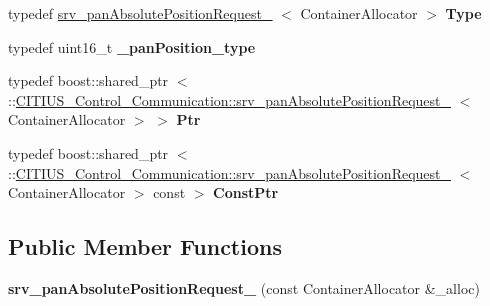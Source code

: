 \begin{DoxyCompactItemize}
\item 
\hypertarget{struct_c_i_t_i_u_s___control___communication_1_1srv__pan_absolute_position_request___a421feafac29586fac2a1c6402ce5b292}{typedef \*
\hyperlink{struct_c_i_t_i_u_s___control___communication_1_1srv__pan_absolute_position_request__}{srv\-\_\-pan\-Absolute\-Position\-Request\-\_\-}\*
$<$ \-Container\-Allocator $>$ {\bfseries \-Type}}\label{struct_c_i_t_i_u_s___control___communication_1_1srv__pan_absolute_position_request___a421feafac29586fac2a1c6402ce5b292}

\item 
\hypertarget{struct_c_i_t_i_u_s___control___communication_1_1srv__pan_absolute_position_request___a801be9388c10191e3f118bec0f98c4f3}{typedef uint16\-\_\-t {\bfseries \-\_\-pan\-Position\-\_\-type}}\label{struct_c_i_t_i_u_s___control___communication_1_1srv__pan_absolute_position_request___a801be9388c10191e3f118bec0f98c4f3}

\item 
\hypertarget{struct_c_i_t_i_u_s___control___communication_1_1srv__pan_absolute_position_request___a12a7f31d5251daf0cb25d2c91fa1fe79}{typedef boost\-::shared\-\_\-ptr\*
$<$ \-::\hyperlink{struct_c_i_t_i_u_s___control___communication_1_1srv__pan_absolute_position_request__}{\-C\-I\-T\-I\-U\-S\-\_\-\-Control\-\_\-\-Communication\-::srv\-\_\-pan\-Absolute\-Position\-Request\-\_\-}\*
$<$ \-Container\-Allocator $>$ $>$ {\bfseries \-Ptr}}\label{struct_c_i_t_i_u_s___control___communication_1_1srv__pan_absolute_position_request___a12a7f31d5251daf0cb25d2c91fa1fe79}

\item 
\hypertarget{struct_c_i_t_i_u_s___control___communication_1_1srv__pan_absolute_position_request___a758810da9625594a846e380fac9e8e9e}{typedef boost\-::shared\-\_\-ptr\*
$<$ \-::\hyperlink{struct_c_i_t_i_u_s___control___communication_1_1srv__pan_absolute_position_request__}{\-C\-I\-T\-I\-U\-S\-\_\-\-Control\-\_\-\-Communication\-::srv\-\_\-pan\-Absolute\-Position\-Request\-\_\-}\*
$<$ \-Container\-Allocator $>$ const  $>$ {\bfseries \-Const\-Ptr}}\label{struct_c_i_t_i_u_s___control___communication_1_1srv__pan_absolute_position_request___a758810da9625594a846e380fac9e8e9e}

\end{DoxyCompactItemize}
\subsection*{\-Public \-Member \-Functions}
\begin{DoxyCompactItemize}
\item 
\hypertarget{struct_c_i_t_i_u_s___control___communication_1_1srv__pan_absolute_position_request___a0e9b01cd289f68e8ccc5d9e3db71a6fa}{{\bfseries srv\-\_\-pan\-Absolute\-Position\-Request\-\_\-} (const \-Container\-Allocator \&\-\_\-alloc)}\label{struct_c_i_t_i_u_s___control___communication_1_1srv__pan_absolute_position_request___a0e9b01cd289f68e8ccc5d9e3db71a6fa}

\end{DoxyCompactItemize}
